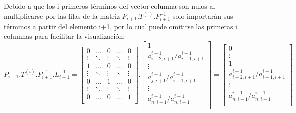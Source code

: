 Debido a que los i primeros términos del vector columna son nulos al multiplicarse por las filas de la matriz $P_{i+1}.T^{(i)}.P_{i+1}^{-1}$ solo importarán sus términos a partir del elemento i+1, por lo cual puede omitirse las primeras i columnas para facilitar la visualización:\\
\[P_{i+1}.T^{(i)}.P_{i+1}^{-1}.L_{i+1}^{-1}=
\begin{bmatrix}
   0 & \dots &  0 & \dots & 0 \\
   \vdots & \ddots & \vdots & \ddots & \vdots \\
   1 & \dots  & 0 & \dots & 0 \\
   \vdots & \ddots & \vdots & \ddots & \vdots \\
    0 & \dots  & 1 & \dots & 0 \\
   \vdots & \ddots & \vdots & \ddots & \vdots \\
   0 & \dots & 0 & \dots & 1 \\
\end{bmatrix}.
\begin{bmatrix}
1\\
a_{i+2,i+1}^{i+1}/a_{i+1,i+1}^{i+1}\\
\vdots\\
a_{j,i+1}^{i+1}/a_{i+1,i+1}^{i+1}\\
\vdots\\
a_{n,i+1}^{i+1}/a_{n,i+1}^{i+1}\\
\end{bmatrix}=
\begin{bmatrix}
0\\
\vdots\\
1\\
a_{i+2,i+1}^{i+1}/a_{i+1,i+1}^{i+1}\\
\vdots\\
a_{n,i+1}^{i+1}/a_{n,i+1}^{i+1}\\
\end{bmatrix}
\]


